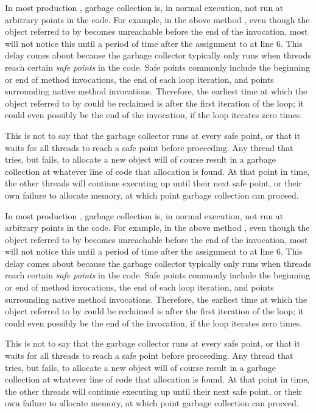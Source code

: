 In most production \jres, garbage collection is, in normal execution, not run at
arbitrary points in the code. For example, in the above method ,
even though the object referred to by  becomes
unreachable before the end of the invocation, most \jres will not notice this
until a period of time after the assignment to  at line 6. This delay
comes about because the garbage collector typically only runs when threads reach
certain \emph{safe points} in the code. Safe points commonly include the
beginning or end of method invocations, the end of each loop iteration, and
points surrounding native method invocations. Therefore, the earliest time at
which the object referred to by  could be reclaimed
is after the first iteration of the loop; it could even possibly be the end of
the invocation, if the loop iterates zero times.

This is not to say that the garbage collector runs at every safe point, or that
it waits for all threads to reach a safe point before proceeding. Any thread that
tries, but fails, to allocate a new object will of course result in a garbage
collection at whatever line of code that allocation is found. At that point in
time, the other threads will continue executing up until their next safe point,
or their own failure to allocate memory, at which point garbage collection can
proceed.


In most production \jres, garbage collection is, in normal execution, not run at
arbitrary points in the code. For example, in the above method ,
even though the object referred to by  becomes
unreachable before the end of the invocation, most \jres will not notice this
until a period of time after the assignment to  at line 6. This delay
comes about because the garbage collector typically only runs when threads reach
certain \emph{safe points} in the code. Safe points commonly include the
beginning or end of method invocations, the end of each loop iteration, and
points surrounding native method invocations. Therefore, the earliest time at
which the object referred to by  could be reclaimed
is after the first iteration of the loop; it could even possibly be the end of
the invocation, if the loop iterates zero times.

This is not to say that the garbage collector runs at every safe point, or that
it waits for all threads to reach a safe point before proceeding. Any thread that
tries, but fails, to allocate a new object will of course result in a garbage
collection at whatever line of code that allocation is found. At that point in
time, the other threads will continue executing up until their next safe point,
or their own failure to allocate memory, at which point garbage collection can
proceed.


